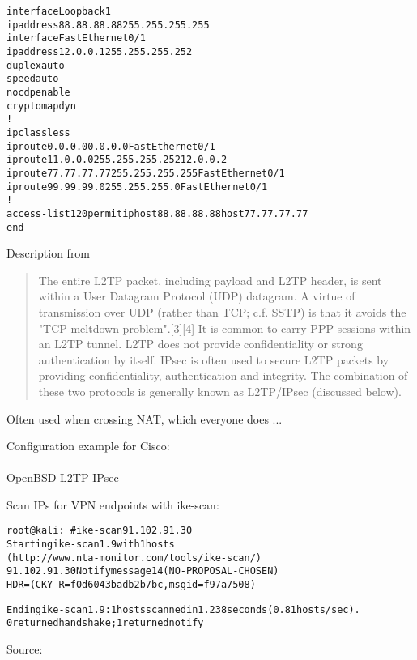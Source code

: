 \documentclass[Screen16to9,17pt]{foils}
\begin{document}
\begin{alltt}\small
interface Loopback1
 ip address 88.88.88.88 255.255.255.255
interface FastEthernet0/1
 ip address 12.0.0.1 255.255.255.252
 duplex auto
 speed auto
 no cdp enable
 crypto map dyn
!
ip classless
ip route 0.0.0.0 0.0.0.0 FastEthernet0/1
ip route 11.0.0.0 255.255.255.252 12.0.0.2
ip route 77.77.77.77 255.255.255.255 FastEthernet0/1
ip route 99.99.99.0 255.255.255.0 FastEthernet0/1
!
access-list 120 permit ip host 88.88.88.88 host 77.77.77.77
end
\end{alltt}


Description from
\begin{quote}\small
The entire L2TP packet, including payload and L2TP header, is sent within a User Datagram Protocol (UDP) datagram. A virtue of transmission over UDP (rather than TCP; c.f. SSTP) is that it avoids the "TCP meltdown problem".[3][4] It is common to carry PPP sessions within an L2TP tunnel. L2TP does not provide confidentiality or strong authentication by itself. IPsec is often used to secure L2TP packets by providing confidentiality, authentication and integrity. The combination of these two protocols is generally known as L2TP/IPsec (discussed below).
\end{quote}


Often used when crossing NAT, which everyone does ...

Configuration example for Cisco:\\
{\small {}}\\
OpenBSD L2TP IPsec\\
{\small{}}

Scan IPs for VPN endpoints with ike-scan:
\begin{alltt}\small
root@kali:~# ike-scan 91.102.91.30
Starting ike-scan 1.9 with 1 hosts
(http://www.nta-monitor.com/tools/ike-scan/)
91.102.91.30	Notify message 14 (NO-PROPOSAL-CHOSEN)
HDR=(CKY-R=f0d6043badb2b7bc, msgid=f97a7508)

Ending ike-scan 1.9: 1 hosts scanned in 1.238 seconds (0.81 hosts/sec).
0 returned handshake; 1 returned notify
\end{alltt}

Source:\\
{\small{}}
\end{document}
